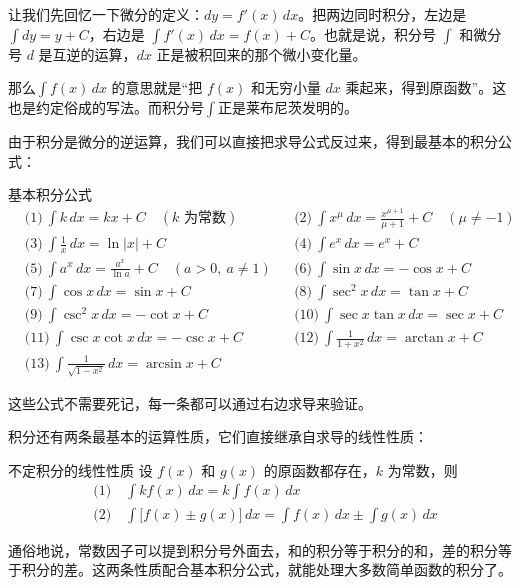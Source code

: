 让我们先回忆一下微分的定义：$dy = f'(x)\,dx$。把两边同时积分，左边是 $\int dy = y + C$，右边是 $\int f'(x)\,dx=f(x)+C$。也就是说，积分号 $\int$ 和微分号 $d$ 是互逆的运算，$dx$ 正是被积回来的那个微小变化量。

那么$\int f(x)\,dx$ 的意思就是“把 $f(x)$ 和无穷小量 $dx$ 乘起来，得到原函数”。这也是约定俗成的写法。而积分号$\int$正是莱布尼茨发明的。

由于积分是微分的逆运算，我们可以直接把求导公式反过来，得到最基本的积分公式：

\begin{theorem}{基本积分公式}{}
\[
\begin{aligned}
&\text{(1)}\ \int k\, dx = kx + C \quad (k\text{ 为常数})
&&\text{(2)}\ \int x^{\mu}\, dx = \frac{x^{\mu+1}}{\mu+1} + C \quad (\mu \neq -1) \\[4pt]
&\text{(3)}\ \int \frac{1}{x}\, dx = \ln|x| + C
&&\text{(4)}\ \int e^x\, dx = e^x + C \\[4pt]
&\text{(5)}\ \int a^x\, dx = \frac{a^x}{\ln a} + C \quad (a>0,\ a\neq 1)
&&\text{(6)}\ \int \sin x\, dx = -\cos x + C \\[4pt]
&\text{(7)}\ \int \cos x\, dx = \sin x + C
&&\text{(8)}\ \int \sec^2 x\, dx = \tan x + C \\[4pt]
&\text{(9)}\ \int \csc^2 x\, dx = -\cot x + C
&&\text{(10)}\ \int \sec x \tan x\, dx = \sec x + C \\[4pt]
&\text{(11)}\ \int \csc x \cot x\, dx = -\csc x + C
&&\text{(12)}\ \int \frac{1}{1+x^2}\, dx = \arctan x + C \\[4pt]
&\text{(13)}\ \int \frac{1}{\sqrt{1-x^2}}\, dx = \arcsin x + C
\end{aligned}
\]
\end{theorem}

这些公式不需要死记，每一条都可以通过右边求导来验证。

积分还有两条最基本的运算性质，它们直接继承自求导的线性性质：

\begin{theorem}{不定积分的线性性质}{}
设 $f(x)$ 和 $g(x)$ 的原函数都存在，$k$ 为常数，则
\[
\begin{aligned}
&\text{(1)}\quad \int k f(x)\, dx = k \int f(x)\, dx \\[4pt]
&\text{(2)}\quad \int \bigl[f(x) \pm g(x)\bigr]\, dx = \int f(x)\, dx \pm \int g(x)\, dx
\end{aligned}
\]
\end{theorem}

通俗地说，常数因子可以提到积分号外面去，和的积分等于积分的和，差的积分等于积分的差。这两条性质配合基本积分公式，就能处理大多数简单函数的积分了。

